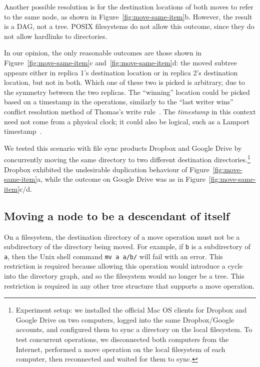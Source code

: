 \documentclass[10pt,journal,compsoc]{IEEEtran}
\begin{document}
Another possible resolution is for the destination locations of both moves to refer to the same node, as shown in Figure~\ref{fig:move-same-item}b.
However, the result is a DAG, not a tree.
POSIX filesystems do not allow this outcome, since they do not allow hardlinks to directories.

In our opinion, the only reasonable outcomes are those shown in Figure~\ref{fig:move-same-item}c and~\ref{fig:move-same-item}d: the moved subtree appears either in replica 1's destination location or in replica 2's destination location, but not in both.
Which one of these two is picked is arbitrary, due to the symmetry between the two replicas.
The ``winning'' location could be picked based on a timestamp in the operations, similarly to the ``last writer wins'' conflict resolution method of Thomas's write rule~\cite{Johnson:1975we}.
The \emph{timestamp} in this context need not come from a physical clock; it could also be logical, such as a Lamport timestamp~\cite{Lamport:1978jq}.

We tested this scenario with file sync products Dropbox and Google Drive by concurrently moving the same directory to two different destination directories.\footnote{Experiment setup: we installed the official Mac OS clients for Dropbox and Google Drive on two computers, logged into the same Dropbox/Google accounts, and configured them to sync a directory on the local filesystem.
To test concurrent operations, we disconnected both computers from the Internet, performed a move operation on the local filesystem of each computer, then reconnected and waited for them to sync.}
Dropbox exhibited the undesirable duplication behaviour of Figure~\ref{fig:move-same-item}a, while the outcome on Google Drive was as in Figure~\ref{fig:move-same-item}c/d.

\subsection{Moving a node to be a descendant of itself}\label{sec:move-cycle}

On a filesystem, the destination directory of a move operation must not be a subdirectory of the directory being moved.
For example, if \texttt{b} is a subdirectory of \texttt{a}, then the Unix shell command \texttt{mv a a/b/} will fail with an error.
This restriction is required because allowing this operation would introduce a cycle into the directory graph, and so the filesystem would no longer be a tree.
This restriction is required in any other tree structure that supports a move operation.
\end{document}
